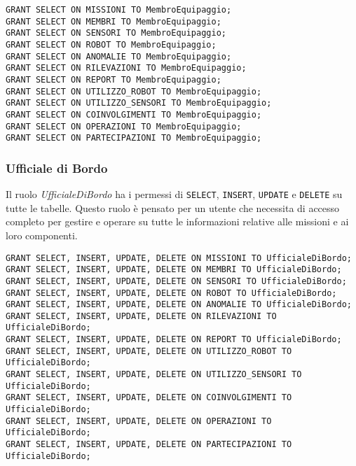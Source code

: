 \begin{lstlisting}
GRANT SELECT ON MISSIONI TO MembroEquipaggio;
GRANT SELECT ON MEMBRI TO MembroEquipaggio;
GRANT SELECT ON SENSORI TO MembroEquipaggio;
GRANT SELECT ON ROBOT TO MembroEquipaggio;
GRANT SELECT ON ANOMALIE TO MembroEquipaggio;
GRANT SELECT ON RILEVAZIONI TO MembroEquipaggio;
GRANT SELECT ON REPORT TO MembroEquipaggio;
GRANT SELECT ON UTILIZZO_ROBOT TO MembroEquipaggio;
GRANT SELECT ON UTILIZZO_SENSORI TO MembroEquipaggio;
GRANT SELECT ON COINVOLGIMENTI TO MembroEquipaggio;
GRANT SELECT ON OPERAZIONI TO MembroEquipaggio;
GRANT SELECT ON PARTECIPAZIONI TO MembroEquipaggio;
\end{lstlisting}

\subsubsection{Ufficiale di Bordo}
Il ruolo \textit{UfficialeDiBordo} ha i permessi di \texttt{SELECT}, \texttt{INSERT}, \texttt{UPDATE} e \texttt{DELETE} su tutte le tabelle.
Questo ruolo è pensato per un utente che necessita di accesso completo per gestire e operare su tutte le informazioni relative alle missioni e ai loro componenti.

\begin{lstlisting}
GRANT SELECT, INSERT, UPDATE, DELETE ON MISSIONI TO UfficialeDiBordo;
GRANT SELECT, INSERT, UPDATE, DELETE ON MEMBRI TO UfficialeDiBordo;
GRANT SELECT, INSERT, UPDATE, DELETE ON SENSORI TO UfficialeDiBordo;
GRANT SELECT, INSERT, UPDATE, DELETE ON ROBOT TO UfficialeDiBordo;
GRANT SELECT, INSERT, UPDATE, DELETE ON ANOMALIE TO UfficialeDiBordo;
GRANT SELECT, INSERT, UPDATE, DELETE ON RILEVAZIONI TO UfficialeDiBordo;
GRANT SELECT, INSERT, UPDATE, DELETE ON REPORT TO UfficialeDiBordo;
GRANT SELECT, INSERT, UPDATE, DELETE ON UTILIZZO_ROBOT TO UfficialeDiBordo;
GRANT SELECT, INSERT, UPDATE, DELETE ON UTILIZZO_SENSORI TO UfficialeDiBordo;
GRANT SELECT, INSERT, UPDATE, DELETE ON COINVOLGIMENTI TO UfficialeDiBordo;
GRANT SELECT, INSERT, UPDATE, DELETE ON OPERAZIONI TO UfficialeDiBordo;
GRANT SELECT, INSERT, UPDATE, DELETE ON PARTECIPAZIONI TO UfficialeDiBordo;
\end{lstlisting}